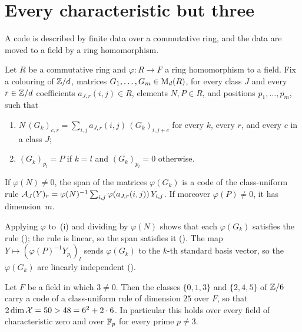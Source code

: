 \section{Every characteristic but three}\label{sec:fields}

A code is described by finite data over a commutative ring, and the data are moved to a field by a ring homomorphism.

\begin{proposition}[Certificates]\label{prop:certificate}
Let $R$ be a commutative ring and $\varphi\colon R\to F$ a ring homomorphism to a field. Fix a colouring of $\mathbb{Z}/d$,
matrices $G_1,\dots,G_m\in\mathrm{M}_d(R)$, for every class $J$ and every $r\in\mathbb{Z}/d$ coefficients $a_{J,r}(i,j)\in R$,
elements $N,P\in R$, and positions $p_1,\dots,p_m$, such that
\begin{enumerate}[label=(\roman*),leftmargin=2em]
\item $N\,(G_k)_{c,r}=\sum_{i,j}a_{J,r}(i,j)\,(G_k)_{i,j+c}$ for every $k$, every $r$, and every $c$ in a class $J$;
\item $(G_k)_{p_l}=P$ if $k=l$ and $(G_k)_{p_l}=0$ otherwise.
\end{enumerate}
If $\varphi(N)\ne0$, the span of the matrices $\varphi(G_k)$ is a code of the class-uniform rule
$\mathcal{A}_J(Y)_r=\varphi(N)^{-1}\sum_{i,j}\varphi(a_{J,r}(i,j))\,Y_{i,j}$. If moreover $\varphi(P)\ne0$, it has
dimension~$m$.
\end{proposition}

\begin{outline}
Applying $\varphi$ to~(i) and dividing by $\varphi(N)$ shows that each $\varphi(G_k)$ satisfies the rule
(); the rule is linear, so the span satisfies it ().
The map $Y\mapsto(\varphi(P)^{-1}Y_{p_l})_l$ sends $\varphi(G_k)$ to the $k$-th standard basis vector, so the
$\varphi(G_k)$ are linearly independent ().
\end{outline}

\begin{theorem}\label{thm:fields}
Let $F$ be a field in which $3\ne0$. Then the classes $\{0,1,3\}$ and $\{2,4,5\}$ of $\mathbb{Z}/6$ carry a code of a
class-uniform rule of dimension $25$ over $F$, so that $2\dim\mathcal{X}=50>48=6^2+2\cdot6$. In particular this holds over
every field of characteristic zero and over $\mathbb{F}_p$ for every prime $p\ne3$.
\end{theorem}

